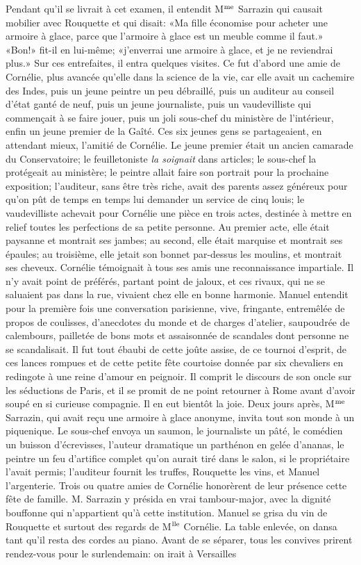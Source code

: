 Pendant qu'il se livrait à cet examen, il entendit M$\textsuperscript{me}$ Sarrazin qui causait mobilier avec Rouquette et qui disait: «Ma fille économise pour acheter une armoire à glace, parce que l'armoire à glace est un meuble comme il faut.» «Bon!» fit-il en lui-même; «j'enverrai une armoire à glace, et je ne reviendrai plus.» Sur ces entrefaites, il entra quelques visites. Ce fut d'abord une amie de Cornélie, plus avancée qu'elle dans la science de la vie, car elle avait un cachemire des Indes, puis un jeune peintre un peu débraillé, puis un auditeur au conseil d'état ganté de neuf, puis un jeune journaliste, puis un vaudevilliste qui commençait à se faire jouer, puis un joli sous-chef du ministère de l'intérieur, enfin un jeune premier de la Gaîté. Ces six jeunes gens se partageaient, en attendant mieux, l'amitié de Cornélie. Le jeune premier était un ancien camarade du Conservatoire; le feuilletoniste \emph{la soignait} dans articles; le sous-chef la protégeait au ministère; le peintre allait faire son portrait pour la prochaine exposition; l'auditeur, sans être très riche, avait des parents assez généreux pour qu'on pût de temps en temps lui demander un service de cinq louis; le vaudevilliste achevait pour Cornélie une pièce en trois actes, destinée à mettre en relief toutes les perfections de sa petite personne. Au premier acte, elle était paysanne et montrait ses jambes; au second, elle était marquise et montrait ses épaules; au troisième, elle jetait son bonnet par-dessus les moulins, et montrait ses cheveux. Cornélie témoignait à tous ses amis une reconnaissance impartiale. Il n'y avait point de préférés, partant point de jaloux, et ces rivaux, qui ne se saluaient pas dans la rue, vivaient chez elle en bonne harmonie. Manuel entendit pour la première fois une conversation parisienne, vive, fringante, entremêlée de propos de coulisses, d'anecdotes du monde et de charges d'atelier, saupoudrée de calembours, pailletée de bons mots et assaisonnée de scandales dont personne ne se scandalisait. Il fut tout ébaubi de cette joûte assise, de ce tournoi d'esprit, de ces lances rompues et de cette petite fête courtoise donnée par six chevaliers en redingote à une reine d'amour en peignoir. Il comprit le discours de son oncle sur les séductions de Paris, et il se promit de ne point retourner à Rome avant d'avoir soupé en si curieuse compagnie. Il en eut bientôt la joie. Deux jours après, M$\textsuperscript{me}$ Sarrazin, qui avait reçu une armoire à glace anonyme, invita tout son monde à un piquenique. Le sous-chef envoya un saumon, le journaliste un pâté, le comédien un buisson d'écrevisses, l'auteur dramatique un parthénon en gelée d'ananas, le peintre un feu d'artifice complet qu'on aurait tiré dans le salon, si le propriétaire l'avait permis; l'auditeur fournit les truffes, Rouquette les vins, et Manuel l'argenterie. Trois ou quatre amies de Cornélie honorèrent de leur présence cette fête de famille. M. Sarrazin y présida en vrai tambour-major, avec la dignité bouffonne qui n'appartient qu'à cette institution. Manuel se grisa du vin de Rouquette et surtout des regards de M$\textsuperscript{lle}$ Cornélie. La table enlevée, on dansa tant qu'il resta des cordes au piano. Avant de se séparer, tous les convives prirent rendez-vous pour le surlendemain: on irait à Versailles 